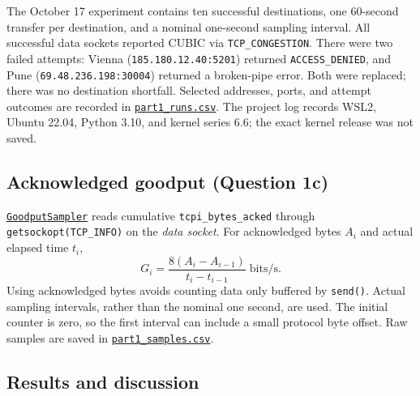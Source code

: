\documentclass[11pt,letterpaper]{article}
\newcommand{\codelink}[2]{\href{https://github.com/RohMalpani/CS422Assignments/blob/main/assignment2/#2}{#1}}
\begin{document}
The October 17 experiment contains ten successful destinations, one
60-second transfer per destination, and a nominal one-second sampling interval.
All successful data sockets reported CUBIC via \texttt{TCP\_CONGESTION}.
There were two failed attempts: Vienna (\texttt{185.180.12.40:5201}) returned
\texttt{ACCESS\_DENIED}, and Pune (\texttt{69.48.236.198:30004}) returned a
broken-pipe error. Both were replaced; there was no destination shortfall.
Selected addresses, ports, and attempt outcomes are recorded in
\codelink{\texttt{part1\_runs.csv}}{results/part1_runs.csv}.
The project log records WSL2, Ubuntu 22.04, Python 3.10, and kernel series 6.6;
the exact kernel release was not saved.

\subsection{Acknowledged goodput (Question 1c)}

\codelink{\texttt{GoodputSampler}}{part1/goodput.py\#L47} reads cumulative
\texttt{tcpi\_bytes\_acked} through \texttt{getsockopt(TCP\_INFO)} on the
\emph{data socket}. For acknowledged bytes $A_i$ and actual elapsed time $t_i$,
\[
G_i=\frac{8(A_i-A_{i-1})}{t_i-t_{i-1}}\;\text{bits/s}.
\]
Using acknowledged bytes avoids counting data only buffered by \texttt{send()}.
Actual sampling intervals, rather than the nominal one second, are used.
The initial counter is zero, so the first interval can include a small protocol
byte offset. Raw samples are saved in
\codelink{\texttt{part1\_samples.csv}}{results/part1_samples.csv}.


\subsection{Results and discussion}
\end{document}
